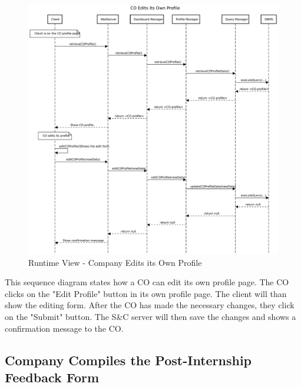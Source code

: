 \begin{figure}[H]
      \centering
      \includegraphics[width=1.0\textwidth]{Images/RV_09.pdf}
      \caption{Runtime View - Company Edits its Own Profile}
      \label{fig:rv-co-edits-profile}
\end{figure}

\par This sequence diagram states how a CO can edit its own profile page. The CO clicks on the "Edit Profile" button
in its own profile page. The client will than show the editing form. After the CO has made the necessary changes,
they click on the "Submit" button. The S\&C server will then save the changes and shows a confirmation message to the
CO.


\subsection{Company Compiles the Post-Internship Feedback Form}
\label{sub:company-compiles-the-post-internship-feedback-form}%

